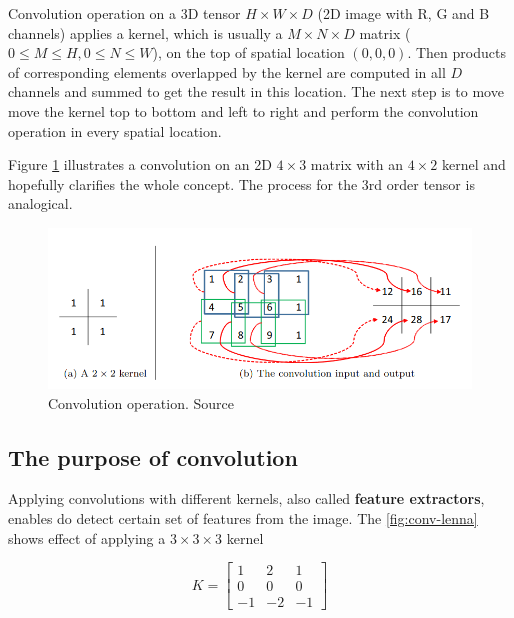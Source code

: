 Convolution operation on a 3D tensor $H \times W \times D$ (2D image with R, G and B channels) applies a kernel, which is usually a $M \times N \times D$ matrix 
($0 \leq M \leq H, 0 \leq N \leq W$), on the top of spatial location $(0, 0, 0)$. Then products of corresponding elements overlapped by the kernel are computed in all $D$ channels and summed to get the result in this location. The next step is to move move the kernel top to bottom and left to right and perform the convolution operation in every spatial location.

Figure \ref{fig:conv-example} illustrates a convolution on an 2D $4 \times 3$ matrix with an $4 \times 2$ kernel and hopefully clarifies the whole concept. The process for the 3rd order tensor is analogical.

\begin{figure}[h]
    \centering
    \includegraphics[width=14cm]{img/ConvExample.png}
    \caption{Convolution operation. Source \cite{Wu2017IntroductionTC}}
    \label{fig:conv-example}
\end{figure}

\subsection{The purpose of convolution}
\label{sub:purpose-of-convolution}

Applying convolutions with different kernels, also called \textbf{feature extractors}, enables do detect certain set of features from the image. The \ref{fig:conv-lenna} shows effect of applying a $3 \times 3 \times 3$ kernel

\begin{equation}
    K = \begin{bmatrix}
            1 & 2 & 1 \\
            0 & 0 & 0 \\
            -1 & -2 & -1
        \end{bmatrix}
\end{equation}

